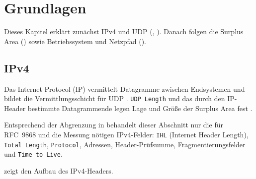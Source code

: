 
\chapter{Grundlagen}
\label{chap:grundlagen}

Dieses Kapitel erklärt zunächst IPv4 und UDP (, ). Danach folgen die
Surplus Area () sowie Betriebssystem und Netzpfad ().

\section{IPv4}
\label{sec:ipv4}

Das Internet Protocol (IP) vermittelt Datagramme zwischen Endsystemen und bildet die Vermittlungsschicht
für UDP \cite{rfc791}. \texttt{UDP Length} und das durch den IP-Header bestimmte Datagrammende legen
Lage und Größe der Surplus Area fest \cite[Sec.~7]{rfc9868}.

Entsprechend der Abgrenzung in  behandelt dieser Abschnitt nur die für RFC~9868 und die Messung
nötigen IPv4-Felder: \texttt{IHL} (Internet Header Length), \texttt{Total Length}, \texttt{Protocol}, Adressen,
Header-Prüfsumme, Fragmentierungsfelder und \texttt{Time to Live}.

 zeigt den Aufbau des IPv4-Headers.

